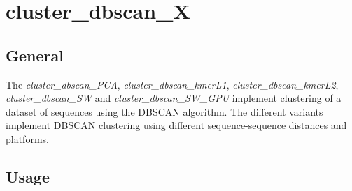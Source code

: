 \section{cluster\_dbscan\_X}

\subsection{General}

The \emph{cluster\_dbscan\_PCA}, \emph{cluster\_dbscan\_kmerL1},
\emph{cluster\_dbscan\_kmerL2}, \emph{cluster\_dbscan\_SW} and
\emph{cluster\_dbscan\_SW\_GPU} implement clustering of a dataset of
sequences using the DBSCAN \cite{dbscan} algorithm. The different
variants implement DBSCAN clustering using different sequence-sequence
distances and platforms. 

\subsection{Usage}

